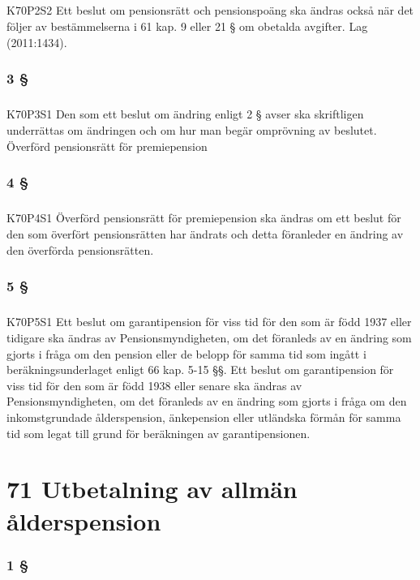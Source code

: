 \documentclass[a4paper,notitlepage,openany,10pt]{book}
\begin{document}
\paragraph*{}
{\tiny K70P2S2}
Ett beslut om pensionsrätt och pensionspoäng ska ändras också när det följer av bestämmelserna i 61 kap. 9 eller 21 § om obetalda avgifter.
Lag (2011:1434).
\subsection*{3 §}
\paragraph*{}
{\tiny K70P3S1}
Den som ett beslut om ändring enligt 2 § avser ska skriftligen underrättas om ändringen och om hur man begär omprövning av beslutet.
Överförd pensionsrätt för premiepension
\subsection*{4 §}
\paragraph*{}
{\tiny K70P4S1}
Överförd pensionsrätt för premiepension ska ändras om ett beslut för den som överfört pensionsrätten har ändrats och detta föranleder en ändring av den överförda pensionsrätten.
\subsection*{5 §}
\paragraph*{}
{\tiny K70P5S1}
Ett beslut om garantipension för viss tid för den som är född 1937 eller tidigare ska ändras av Pensionsmyndigheten, om det föranleds av en ändring som gjorts i fråga om den pension eller de belopp för samma tid som ingått i beräkningsunderlaget enligt 66 kap. 5-15 §§.
Ett beslut om garantipension för viss tid för den som är född 1938 eller senare ska ändras av Pensionsmyndigheten, om det föranleds av en ändring som gjorts i fråga om den inkomstgrundade ålderspension, änkepension eller utländska förmån för samma tid som legat till grund för beräkningen av garantipensionen.
\chapter*{71 Utbetalning av allmän ålderspension}
\subsection*{1 §}
\end{document}
